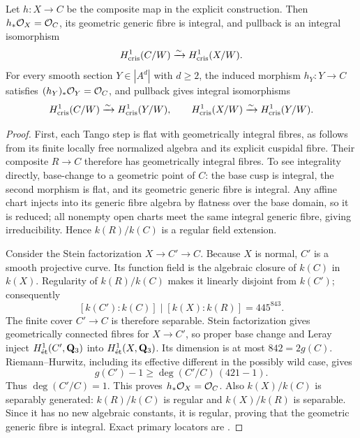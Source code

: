 \begin{lemma}
\label{lem:OC-integral-first-lattice}
Let $h:X\to C$ be the composite map in the explicit construction.  Then $h_*\OO_X=\OO_C$, its geometric generic fibre is integral, and pullback is an integral isomorphism
\[
                 H^1_{\cris}(C/W)\xrightarrow{\sim}H^1_{\cris}(X/W).
\]
For every smooth section $Y\in|A^d|$ with $d\geq2$, the induced morphism $h_Y:Y\to C$ satisfies $(h_Y)_*\OO_Y=\OO_C$, and pullback gives integral isomorphisms
\[
       H^1_{\cris}(C/W)\xrightarrow{\sim}H^1_{\cris}(Y/W),
       \qquad H^1_{\cris}(X/W)\xrightarrow{\sim}H^1_{\cris}(Y/W).
\]
\end{lemma}
\begin{proof}
First, each Tango step is flat with geometrically integral fibres, as follows from its finite locally free normalized algebra and its explicit cuspidal fibre.  Their composite $R\to C$ therefore has geometrically integral fibres.  To see integrality directly, base-change to a geometric point of $C$: the base cusp is integral, the second morphism is flat, and its geometric generic fibre is integral.  Any affine chart injects into its generic fibre algebra by flatness over the base domain, so it is reduced; all nonempty open charts meet the same integral generic fibre, giving irreducibility.  Hence $k(R)/k(C)$ is a regular field extension.

Consider the Stein factorization $X\to C'\to C$.  Because $X$ is normal, $C'$ is a smooth projective curve.  Its function field is the algebraic closure of $k(C)$ in $k(X)$.  Regularity of $k(R)/k(C)$ makes it linearly disjoint from $k(C')$; consequently
\[
                  [k(C'):k(C)]\mid[k(X):k(R)]=445^{843}.
\]
The finite cover $C'\to C$ is therefore separable.  Stein factorization gives geometrically connected fibres for $X\to C'$, so proper base change and Leray inject $H^1_{\et}(C',\mathbf Q_3)$ into $H^1_{\et}(X,\mathbf Q_3)$.  Its dimension is at most $842=2g(C)$.  Riemann--Hurwitz, including its effective different in the possibly wild case, gives
\[
                  g(C')-1\geq\deg(C'/C)\,(421-1).
\]
Thus $\deg(C'/C)=1$.  This proves $h_*\OO_X=\OO_C$.
Also $k(X)/k(C)$ is separably generated: $k(R)/k(C)$ is regular and $k(X)/k(R)$ is separable.  Since it has no new algebraic constants, it is regular, proving that the geometric generic fibre is integral.  Exact primary locators are
\cite[Theorem~37.53.4, Tag~03H0; Lemma~53.12.2, Tag~0C1D, in Section~53.12, Tag~0C1B]{StacksProject}.


\end{proof}
